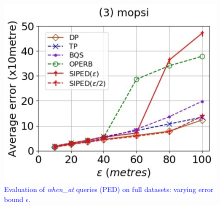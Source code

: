 \begin{figure}[tb!]
	\includegraphics[scale = 0.400]{Figures/Exp-when-PED-error-epsilon-mopsi.jpg}
	\vspace{-1ex}
	\caption{\small \textcolor{blue}{Evaluation of \emph{when\_at} queries (PED) on full datasets: varying error bound $\epsilon$.}}
	\label{fig:query-when-ped-epsilon}
	\vspace{-1.0ex}
\end{figure}


